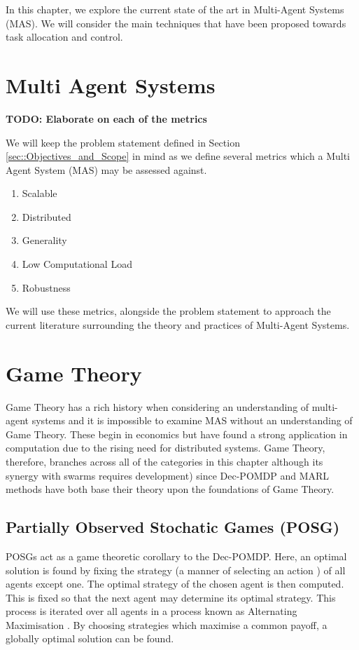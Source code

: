 \documentclass[.../main.tex]{subfiles}
\begin{document}
In this chapter, we explore the current state of the art in Multi-Agent Systems (MAS). We will
consider the main techniques that have been proposed towards task allocation and control. 

\section{Multi Agent Systems} \label{sec::Multi_Agent_Systems}

\textbf{TODO: Elaborate on each of the metrics}

We will keep the problem statement defined in Section \ref{sec::Objectives_and_Scope} in mind as
we define several metrics which a Multi Agent System (MAS) may be assessed against.

\begin{enumerate}
    \item Scalable
    \item Distributed
    \item Generality
    \item Low Computational Load
    \item Robustness
\end{enumerate}

We will use these metrics, alongside the problem statement to approach the current literature
surrounding the theory and practices of Multi-Agent Systems. 

\section{Game Theory} \label{sec::Game_Theory}

Game Theory has a rich history when considering an understanding of multi-agent systems and it
is impossible to examine MAS without an understanding of Game Theory. These
begin in economics but have found a strong application in computation due to the rising need for
distributed systems. Game Theory, therefore, branches across all of the categories in this
chapter although its synergy with swarms requires development) since Dec-POMDP
and MARL methods have both base their theory upon the foundations of Game Theory.

\subsection{Partially Observed Stochatic Games (POSG)} \label{sec::Stochastic_Games}

POSGs act as a game theoretic corollary to the Dec-POMDP. Here, an optimal solution is found by fixing the strategy (a manner of selecting an action \cite{Rizk2018DecisionSurvey}) of all agents except one. The optimal strategy of the chosen agent is then computed. This is fixed so that the next agent may determine its optimal strategy. This process is iterated over all agents in a process known as Alternating Maximisation \cite{Ray2010AnCooperation}. By choosing strategies which maximise a common payoff, a globally optimal solution can be found.
\end{document}
